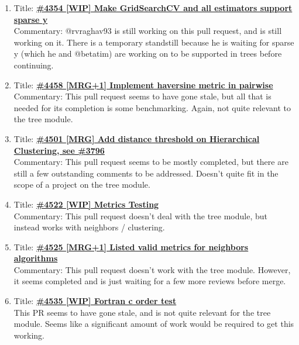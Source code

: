 \documentclass[12pt, oneside]{article}
\begin{document}
\begin{enumerate}
  \item 
  Title:
  \textbf{\href{https://github.com/scikit-learn/scikit-learn/pull/4354}
    {\#4354 [WIP] Make GridSearchCV and all estimators support sparse y}}\\
  Commentary: @rvraghav93 is still working on this pull request, and
  is still working on it. There is a temporary standstill because he
  is waiting for sparse y (which he and @betatim) are working on to be
  supported in trees before continuing.

  \item 
  Title:
  \textbf{\href{https://github.com/scikit-learn/scikit-learn/pull/4458}    
    {\#4458 [MRG+1] Implement haversine metric in pairwise}}\\
  Commentary: This pull request seems to have gone stale, but all that
  is needed for its completion is some benchmarking. Again, not quite
  relevant to the tree module.

  \item 
  Title:
  \textbf{\href{https://github.com/scikit-learn/scikit-learn/pull/4501}
    {\#4501 [MRG] Add distance threshold on Hierarchical Clustering,
      see \#3796}}\\
  Commentary: This pull request seems to be mostly completed, but
  there are still a few outstanding comments to be addressed. Doesn't
  quite fit in the scope of a project on the tree module.

  \item 
  Title:
  \textbf{\href{https://github.com/scikit-learn/scikit-learn/pull/4522}
    {\#4522 [WIP] Metrics Testing}}\\
  Commentary: This pull request doesn't deal with the tree module, but
  instead works with neighbors / clustering.

  \item 
  Title:
  \textbf{\href{https://github.com/scikit-learn/scikit-learn/pull/4525}
    {\#4525 [MRG+1] Listed valid metrics for neighbors algorithms}}\\
  Commentary: This pull request doesn't work with the tree
  module. However, it seems completed and is just waiting for a
  few more reviews before merge.

  \item
  Title:
  \textbf{\href{https://github.com/scikit-learn/scikit-learn/pull/4535}
    {\#4535 [WIP] Fortran c order test}}\\
  This PR seems to have gone stale, and is not quite relevant for the
  tree module. Seems like a significant amount of work would be
  required to get this working.


\end{enumerate}
\end{document}
